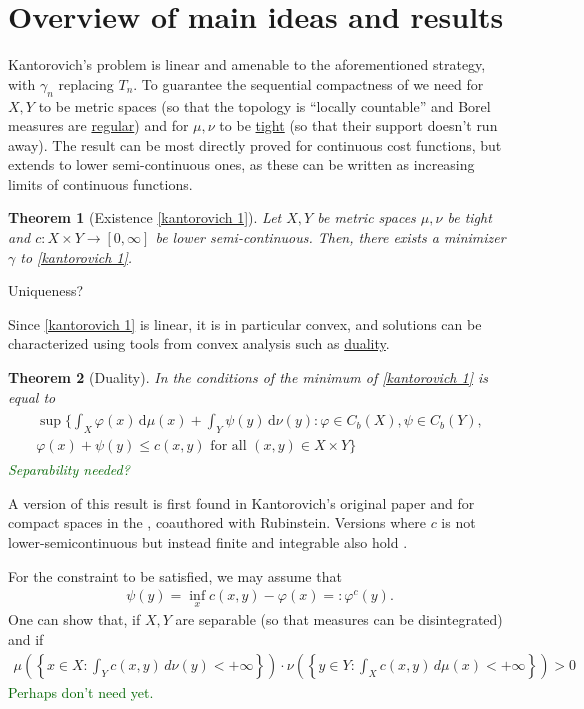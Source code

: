 \documentclass[
    a4paper,
    DIV=14,
    abstract=true,
    numbers=noenddot
]
{scrartcl}
\newtheorem{theorem}{Theorem}[section]
\theoremstyle{definition}
\newcommand{\liam}{\textcolor{darkgreen}}
\renewcommand{\d}{\,\mathrm{d}}\newcommand{\dx}{\,\mathrm{d}x}
\begin{document}
\section{Overview of main ideas and results}
Kantorovich's problem is linear and amenable to the aforementioned strategy, with $\gamma_n$ replacing $T_n$. To guarantee the sequential compactness of  we need for  $X, Y$ to be metric spaces (so that the topology is ``locally countable'' and Borel measures are \href{https://en.wikipedia.org/wiki/Regular_measure}{regular}) and for $\mu, \nu $ to be \href{https://en.wikipedia.org/wiki/Tightness_of_measures}{tight} (so that their support doesn't run away). The result can be most directly proved for continuous cost functions, but extends to lower semi-continuous ones, as these can be written as increasing limits of continuous functions.
\begin{theorem}[Existence \eqref{kantorovich 1}]\label{existence theorem}
Let $X,Y$ be metric spaces $\mu , \nu $ be tight and $c: X \times Y \to [0, \infty]$ be lower semi-continuous. Then, there exists a minimizer $\gamma $ to \eqref{kantorovich 1}.   
\end{theorem}
Uniqueness?

Since \eqref{kantorovich 1} is linear, it is in particular convex, and solutions can be characterized using tools from convex analysis such as \href{https://en.wikipedia.org/wiki/Duality_(optimization)}{duality}.
\begin{theorem}[Duality]\label{duality theorem}
In the conditions of  the minimum of \eqref{kantorovich 1} is equal to 
\begin{align}\label{max}
\begin{split}
    \sup \bigg\{ \int_{X}\varphi (x) \d\mu(x) + \int_{Y} \psi (y)\d\nu(y) : \varphi \in C_b(X), \psi \in C_b(Y), \\ \varphi (x)+ \psi (y) \leq c(x,y) \text{ for all } (x,y) \in X \times Y \bigg\}
\end{split}
\end{align}
\liam{Separability needed?}
\end{theorem}
A version of this result is first found in Kantorovich's original paper \cite{kantorovich1942transfer} and for compact spaces in the \cite{kantorovich1957function}, \cite{zbMATH03134565} coauthored with Rubinstein. Versions where $c$ is not lower-semicontinuous but instead finite and integrable also hold \cite[Theorem 1.3.2]{bogachev2012monge}. 

For the constraint to be satisfied, we may assume that 
\begin{align*}
    \psi(y)=\inf_x c(x,y)- \varphi(x)=: \varphi^c(y).
\end{align*}
One can show that, if $X,Y$ are separable (so that measures can be disintegrated) and if 
\begin{align}\label{finite}
    \mu\left(\left\{x \in X : \int_{Y} c(x,y)\,d\nu(y) < +\infty\right\}\right)\cdot 
    \nu\left(\left\{y \in Y : \int_{X} c(x,y)\,d\mu(x) < +\infty\right\}\right) > 0
\end{align}
\liam{Perhaps don't need yet.}
\end{document}
